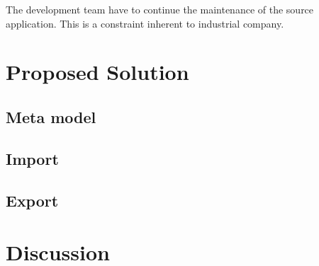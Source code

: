 \documentclass[conference]{IEEEtran}
\begin{document}
The development team have to continue the maintenance of the source application.
This is a constraint inherent to industrial company.




\section{Proposed Solution}
\label{sec:contribution}

\subsection{Meta model}

\subsection{Import}

\subsection{Export}



\section{Discussion}
\label{sec:discussion}



\end{document}
